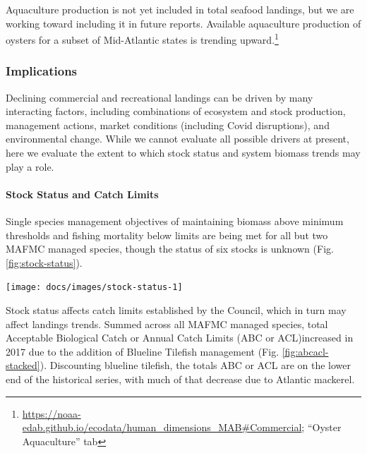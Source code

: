 \documentclass[
  10pt,
]{article}
\let\origfigure\figure
\let\endorigfigure\endfigure
\renewenvironment{figure}[1][2] {
    \expandafter\origfigure\expandafter[H]
} {
    \endorigfigure
}
\begin{document}
Aquaculture production is not yet included in total seafood landings,
but we are working toward including it in future reports. Available
aquaculture production of oysters for a subset of Mid-Atlantic states is
trending upward.\footnote{\url{https://noaa-edab.github.io/ecodata/human_dimensions_MAB\#Commercial};
  ``Oyster Aquaculture'' tab}

\hypertarget{implications}{%
\subsubsection{Implications}\label{implications}}

Declining commercial and recreational landings can be driven by many
interacting factors, including combinations of ecosystem and stock
production, management actions, market conditions (including Covid
disruptions), and environmental change. While we cannot evaluate all
possible drivers at present, here we evaluate the extent to which stock
status and system biomass trends may play a role.

\hypertarget{stock-status-and-catch-limits}{%
\paragraph{Stock Status and Catch
Limits}\label{stock-status-and-catch-limits}}

Single species management objectives of maintaining biomass above
minimum thresholds and fishing mortality below limits are being met for
all but two MAFMC managed species, though the status of six stocks is
unknown (Fig. \ref{fig:stock-status}).

\begin{figure}

{\centering \texttt{[image: docs/images/stock-status-1]} 

}

\caption{Summary of single species status for MAFMC and jointly federally managed stocks (Goosefish and Spiny dogfish). Stocks in green are below the biomass threshold (overfished), stocks in orange are above the biomass threshold but below the biomass target, and stocks in purple are above the biomass target. Only one stock, Atlantic mackerel, has fishing mortality above the limit (subject to overfishing).}\label{fig:stock-status}
\end{figure}

Stock status affects catch limits established by the Council, which in
turn may affect landings trends. Summed across all MAFMC managed
species, total Acceptable Biological Catch or Annual Catch Limits (ABC
or ACL)increased in 2017 due to the addition of Blueline Tilefish
management (Fig. \ref{fig:abcacl-stacked}). Discounting blueline
tilefish, the totals ABC or ACL are on the lower end of the historical
series, with much of that decrease due to Atlantic mackerel.
\end{document}
